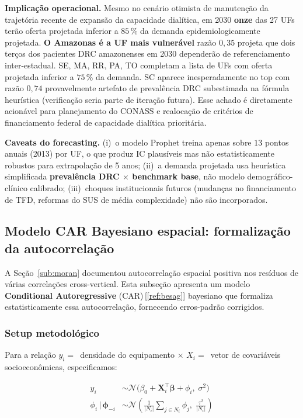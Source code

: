 \documentclass[12pt,a4paper,oneside]{article}
\begin{document}
\textbf{Implicação operacional.} Mesmo no cenário otimista de
manutenção da trajetória recente de expansão da capacidade
dialítica, em 2030 \textbf{onze} das 27 UFs terão oferta
projetada inferior a $85\,\%$ da demanda epidemiologicamente
projetada. \textbf{O Amazonas é a UF mais vulnerável}
\textemdash{} razão $0{,}35$ projeta que dois terços dos
pacientes DRC amazonenses em 2030 dependerão de referenciamento
inter-estadual. SE, MA, RR, PA, TO completam a lista de UFs com
oferta projetada inferior a $75\,\%$ da demanda. SC aparece
inesperadamente no top com razão $0{,}74$ \textemdash{}
provavelmente artefato de prevalência DRC subestimada na
fórmula heurística (verificação seria parte de iteração futura).
Esse achado é diretamente acionável para planejamento do CONASS
e realocação de critérios de financiamento federal de capacidade
dialítica prioritária.

\textbf{Caveats do forecasting.} (i)~o modelo Prophet treina
apenas sobre $13$ pontos anuais (2013) por UF,
o que produz IC plausíveis mas não estatisticamente robustos para
extrapolação de 5 anos; (ii)~a demanda projetada usa heurística
simplificada \textbf{prevalência DRC $\times$ benchmark base}, não
modelo demográfico-clínico calibrado; (iii)~choques institucionais
futuros (mudanças no financiamento de TFD, reformas do SUS de média
complexidade) não são incorporados.

\subsection{Modelo CAR Bayesiano espacial: formalização
da autocorrelação}\label{sub:ml-car}

A Seção~\ref{sub:moran} documentou autocorrelação espacial
positiva nos resíduos de várias correlações cross-vertical. Esta
subseção apresenta um modelo \textbf{Conditional Autoregressive}
(CAR)\,[\ref{ref:besag}] bayesiano que formaliza estatisticamente
essa autocorrelação, fornecendo erros-padrão corrigidos.

\subsubsection{Setup metodológico}

Para a relação $y_i = $~densidade do equipamento $\times$
$X_i = $~vetor de covariáveis socioeconômicas, especificamos:

\begin{align}
y_i &\sim \mathcal{N}\bigl(\beta_0 + \mathbf{X}_i^\top \boldsymbol{\beta}
+ \phi_i, \;\sigma^2\bigr) \label{eq:car-y} \\
\phi_i \,|\, \boldsymbol{\phi}_{-i} &\sim \mathcal{N}\!\left(
  \frac{1}{|N_i|}\sum_{j \in N_i} \phi_j, \; \frac{\tau^2}{|N_i|}
\right) \label{eq:car-phi}
\end{align}
\end{document}
